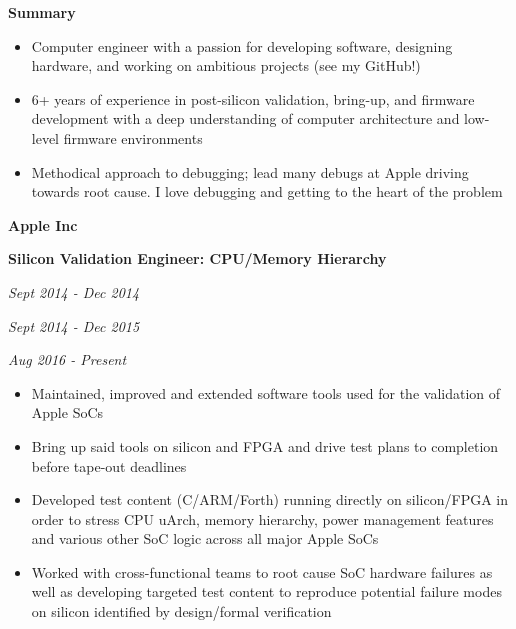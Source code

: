 \documentclass{article}
\newenvironment{name}{\fontfamily{phv}\selectfont\bfseries\normalsize}{\par}
\newenvironment{colorheading}{\fontfamily{phv}\selectfont\bfseries\normalsize\color{darkcyan}}{\par}
\newenvironment{metadata}{\fontfamily{phv}\selectfont\itshape\small\color{darkgray}}{\par}
\newenvironment{itemizedbody}{\fontfamily{phv}\selectfont\small\raggedright\begin{itemize}}{\end{itemize}\par}
\newenvironment{experience}[2]%
{%
  \begin{minipage}{0.71\linewidth}\raggedright#1\end{minipage}%
  \hfill%
  \begin{minipage}{0.28\linewidth}\raggedleft#2\end{minipage}%
}%
{\par}
\newcommand{\lineitem}{\item[{$\star$}]}
\newcommand{\dotsep}{\smallskip\begin{centering}\begin{colorheading}{\large$\bullet$}\end{colorheading}\end{centering}\smallskip}
\begin{document}
  \hfill
  \begin{minipage}[t]{0.67\linewidth}
    \begin{experience}
    {
      \begin{name}Summary\end{name}
    }{}
    \end{experience}
    \begin{itemizedbody}
      \lineitem Computer engineer with a passion for developing software, designing hardware, and working on ambitious projects
                (see my GitHub!)
      \lineitem 6+ years of experience in post-silicon validation, bring-up, and firmware development with a deep understanding
                of computer architecture and low-level firmware environments
      \lineitem Methodical approach to debugging; lead many debugs at Apple driving towards root cause. I love debugging and
                getting to the heart of the problem
    \end{itemizedbody}
    \dotsep
    \begin{experience}
    {
      \begin{name}Apple Inc\end{name}
      \begin{colorheading}Silicon Validation Engineer: CPU/Memory Hierarchy\end{colorheading}
    }
    {
      \begin{metadata}Sept 2014 - Dec 2014\end{metadata}
      \begin{metadata}Sept 2014 - Dec 2015\end{metadata}
      \begin{metadata}Aug 2016 - Present\end{metadata}
    }
    \end{experience}
    \begin{itemizedbody}
      \lineitem Maintained, improved and extended software tools used for the validation of Apple SoCs
      \lineitem Bring up said tools on silicon and FPGA and drive test plans to completion before tape-out deadlines
      \lineitem Developed test content (C/ARM/Forth) running directly on silicon/FPGA in order to stress CPU uArch, memory
                hierarchy, power management features and various other SoC logic across all major Apple SoCs
      \lineitem Worked with cross-functional teams to root cause SoC hardware failures as well as developing
                targeted test content to reproduce potential failure modes on silicon identified by design/formal verification

\end{itemizedbody}
\end{minipage}
\end{document}
